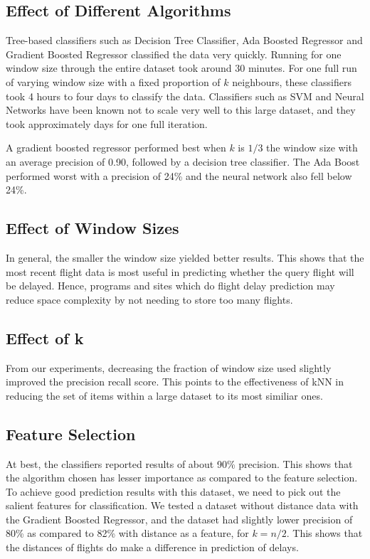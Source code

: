 \documentclass[letterpaper,11pt]{article}
\begin{document}
\subsection{Effect of Different Algorithms}
Tree-based classifiers such as Decision Tree Classifier, Ada Boosted Regressor and Gradient Boosted Regressor classified the data very quickly. Running for one window size through the entire dataset took around 30 minutes. For one full run of varying window size with a fixed proportion of $k$ neighbours, these classifiers took 4 hours to four days to classify the data. Classifiers such as SVM and Neural Networks have been known not to scale very well to this large dataset, and they took approximately days for one full iteration. 

A gradient boosted regressor performed best when $k$ is $1/3$ the window size with an average precision of 0.90, followed by a decision tree classifier. The Ada Boost performed worst with a precision of 24\% and the neural network also fell below 24\%. 

\subsection{Effect of Window Sizes}
In general, the smaller the window size yielded better results. This shows that the most recent flight data is most useful in predicting whether the query flight will be delayed. Hence, programs and sites which do flight delay prediction may reduce space complexity by not needing to store too many flights. 

\subsection{Effect of k}
From our experiments, decreasing the fraction of window size used slightly improved the precision recall score. This points to the effectiveness of kNN in reducing the set of items within a large dataset to its most similiar ones.

\subsection{Feature Selection} 
At best, the classifiers reported results of about 90\% precision. This shows that the algorithm chosen has lesser importance as compared to the feature selection. To achieve good prediction results with this dataset, we need to pick out the salient features for classification. We tested a dataset without distance data with the Gradient Boosted Regressor, and the dataset had slightly lower precision of 80\% as compared to 82\% with distance as a feature, for $k=n/2$. This shows that the distances of flights do make a difference in prediction of delays. 
\end{document}
